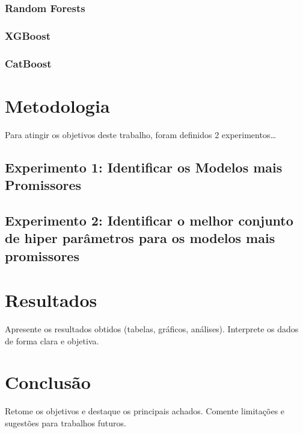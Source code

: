 \documentclass{article}
\begin{document}
\subsubsection{Random Forests}
\subsubsection{XGBoost}
\subsubsection{CatBoost}

\section{Metodologia}

Para atingir os objetivos deste trabalho, foram definidos 2 experimentos\dots

\subsection{Experimento 1: Identificar os Modelos mais Promissores}

\subsection{Experimento 2: Identificar o melhor conjunto de hiper parâmetros para os modelos mais promissores}


\section{Resultados}
Apresente os resultados obtidos (tabelas, gráficos, análises). Interprete os dados de forma clara e objetiva.

\section{Conclusão}
Retome os objetivos e destaque os principais achados. Comente limitações e sugestões para trabalhos futuros.

\newpage
\end{document}
